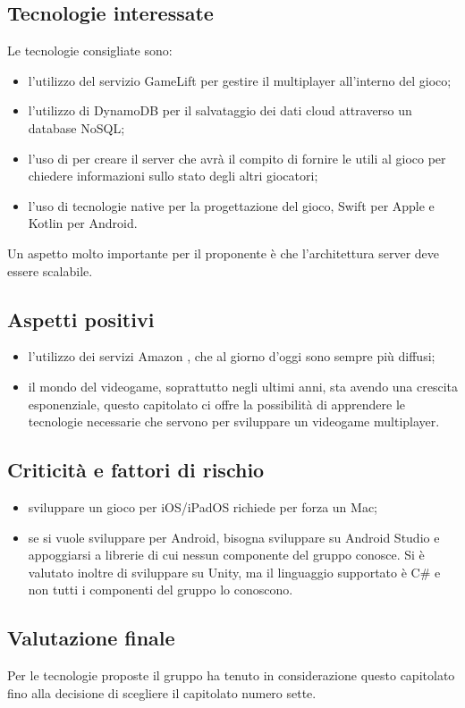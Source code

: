 \subsection{Tecnologie interessate}
Le tecnologie consigliate sono:
\begin{itemize}
\item l'utilizzo del servizio  GameLift per gestire il multiplayer all'interno del gioco;
\item l'utilizzo di  DynamoDB per il salvataggio dei dati cloud attraverso un database NoSQL;
\item l'uso di  per creare il server che avrà il compito di fornire le  utili al gioco per chiedere informazioni sullo stato degli altri giocatori;
\item l'uso di tecnologie native per la progettazione del gioco, Swift per Apple e Kotlin per Android.
\end{itemize}
Un aspetto molto importante per il proponente è che l'architettura server deve essere scalabile.

\subsection{Aspetti positivi}
\begin{itemize}
\item l'utilizzo dei servizi Amazon , che al giorno d'oggi sono sempre più diffusi;
\item il mondo del videogame, soprattutto negli ultimi anni, sta avendo una crescita esponenziale, questo capitolato ci offre la possibilità di apprendere le tecnologie necessarie che servono per sviluppare un videogame multiplayer.
\end{itemize}

\subsection{Criticità e fattori di rischio}
\begin{itemize}
\item sviluppare un gioco per iOS/iPadOS richiede per forza un Mac;
\item se si vuole sviluppare per Android, bisogna sviluppare su Android Studio e appoggiarsi a librerie di cui nessun componente del gruppo conosce. 
Si è valutato inoltre di sviluppare su Unity, ma il linguaggio supportato è C\# e non tutti i componenti del gruppo lo conoscono.
\end{itemize}

\subsection{Valutazione finale}
Per le tecnologie proposte il gruppo \textit{\Gruppo{}} ha tenuto in considerazione questo capitolato fino alla decisione di scegliere il capitolato numero sette.
